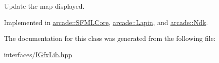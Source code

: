 Update the map displayed. 



Implemented in \hyperlink{classarcade_1_1_s_f_m_l_core_a455e14cf3f8eb326de84f2cfb85e3ac4}{arcade\-::\-S\-F\-M\-L\-Core}, \hyperlink{classarcade_1_1_lapin_a4ae960b8ba5c0cebd6bc6eb887a5ecd8}{arcade\-::\-Lapin}, and \hyperlink{classarcade_1_1_ndk_a57ae460fa24052c8dbedaa22b3005b0c}{arcade\-::\-Ndk}.



The documentation for this class was generated from the following file\-:\begin{DoxyCompactItemize}
\item 
interfaces/\hyperlink{_i_gfx_lib_8hpp}{I\-Gfx\-Lib.\-hpp}\end{DoxyCompactItemize}
